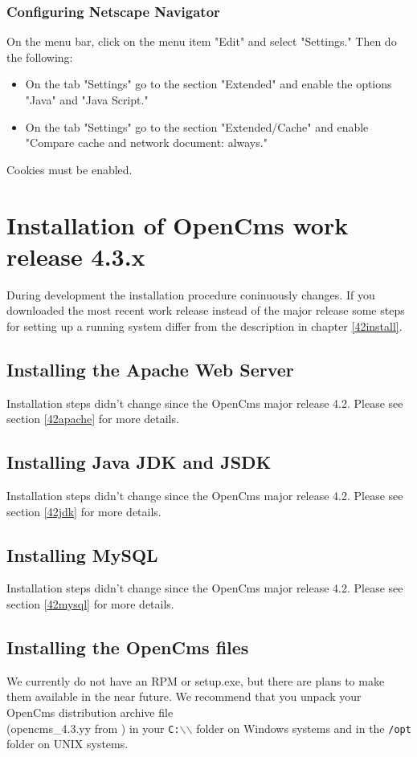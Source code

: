 \subsection{Configuring Netscape Navigator}

On the menu bar, click on the menu item "Edit" and select "Settings." 
Then do the following: 
\begin{itemize}
\item On the tab "Settings" go to the section "Extended" and enable the options "Java" and "Java 
  Script." 
\item On the tab "Settings" go to the section "Extended/Cache" and enable "Compare cache and 
  network document: always." 
\end{itemize}
Cookies must be enabled.

\chapter{Installation of OpenCms work release 4.3.x}
During development the installation procedure coninuously
changes. If you downloaded the most recent work release
instead of the major release some steps for setting up a running
system differ from the description in chapter \ref{42install}.

\section{Installing the Apache Web Server}

Installation steps didn't change since the OpenCms major release 4.2. Please
see section \ref{42apache} for more details.

\section{Installing Java JDK and JSDK}

Installation steps didn't change since the OpenCms major release 4.2. Please
see section \ref{42jdk} for more details.

\section{Installing MySQL}

Installation steps didn't change since the OpenCms major release 4.2. Please
see section \ref{42mysql} for more details.

\section{Installing the OpenCms files}
We currently do not have an RPM or setup.exe, 
but there are plans to make them available in the near future.
We recommend that you unpack your OpenCms distribution archive file\\ 
(opencms\_4.3.yy from 
)
in your \texttt{C:$\backslash$$\backslash$} folder on Windows systems and 
in the \texttt{/opt} folder on UNIX systems. 

